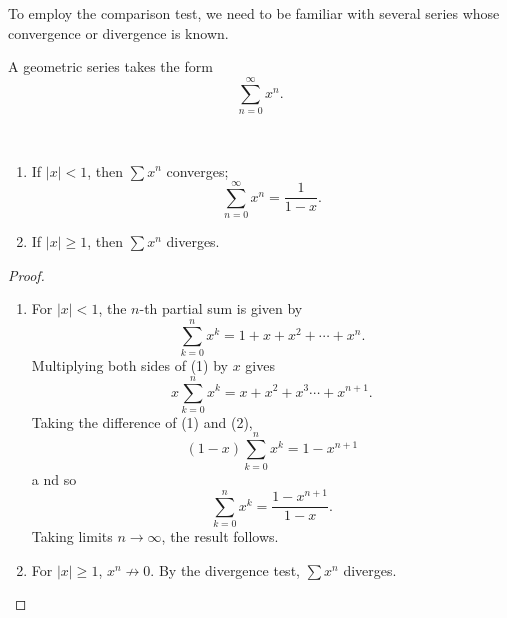 To employ the comparison test, we need to be familiar with several series whose convergence or divergence is known.

\begin{example}
A geometric series takes the form
\[\sum_{n=0}^{\infty}x^n.\]

\begin{proposition*} \
\begin{enumerate}[label=(\roman*)]
\item If $|x|<1$, then $\sum x^n$ converges;
\[\sum_{n=0}^{\infty}x^n=\frac{1}{1-x}.\]
\item If $|x|\ge1$, then $\sum x^n$ diverges.
\end{enumerate}
\end{proposition*}

\begin{proof} \
\begin{enumerate}[label=(\roman*)]
\item For $|x|<1$, the $n$-th partial sum is given by
\begin{equation*}\tag{1}
\sum_{k=0}^{n}x^k=1+x+x^2+\cdots+x^n.
\end{equation*}
Multiplying both sides of (1) by $x$ gives
\begin{equation*}\tag{2}
x\sum_{k=0}^{n}x^k=x+x^2+x^3\cdots+x^{n+1}.
\end{equation*}
Taking the difference of (1) and (2),
\[(1-x)\sum_{k=0}^{n}x^k=1-x^{n+1}\]a
nd so
\[\sum_{k=0}^{n}x^k=\frac{1-x^{n+1}}{1-x}.\]
Taking limits $n\to\infty$, the result follows.

\item For $|x|\ge 1$, $x^n\not\to 0$. By the divergence test, $\sum x^n$ diverges.
\end{enumerate}
\end{proof}
\end{example}

